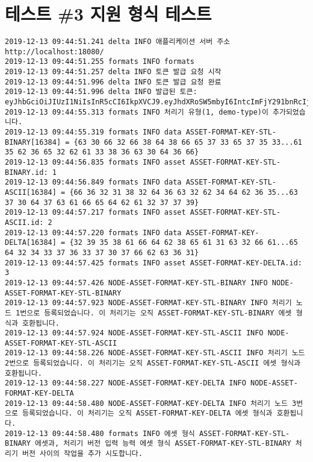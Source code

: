 \section{테스트 \#3 지원 형식 테스트}
\begin{Verbatim}[fontsize=\tiny, breaklines=true, breakanywhere=true]
2019-12-13 09:44:51.241 delta INFO 애플리케이션 서버 주소 http://localhost:18080/
2019-12-13 09:44:51.255 formats INFO formats
2019-12-13 09:44:51.257 delta INFO 토큰 발급 요청 시작
2019-12-13 09:44:51.996 delta INFO 토큰 발급 요청 완료
2019-12-13 09:44:51.996 delta INFO 발급된 토큰: eyJhbGciOiJIUzI1NiIsInR5cCI6IkpXVCJ9.eyJhdXRoSW5mbyI6IntcImFjY291bnRcIjp7XCJpZFwiOjEsXCJ1c2VybmFtZVwiOlwiRGVmYXVsdEFkbWluVXNlclwifSxcInJvbGVcIjpcIkFkbWluXCJ9IiwianRpIjoiZWNiZWE5MmM1MmJiYmI2MzA1ZDE3ZGEzMjU1ZGE4ZjVjNTk3MzY5MmEyZDBmYjk5MTU4MDlkZTg3ZTNlYTQyNyIsImlzcyI6IkRlbHRhLkFwcFNlcnZlciIsImF1ZCI6IkRlbHRhLkFwcFNlcnZlciJ9.KzRVc8eEGg7VPTk5fZzyi3lK_OQnYqWtGm2fnFbc3FI
2019-12-13 09:44:55.313 formats INFO 처리기 유형(1, demo-type)이 추가되었습니다.
2019-12-13 09:44:55.319 formats INFO data ASSET-FORMAT-KEY-STL-BINARY[16384] = {63 30 66 32 66 38 64 38 66 65 37 33 65 37 35 33...61 35 62 36 65 32 62 61 33 38 36 63 30 64 36 66}
2019-12-13 09:44:56.835 formats INFO asset ASSET-FORMAT-KEY-STL-BINARY.id: 1
2019-12-13 09:44:56.849 formats INFO data ASSET-FORMAT-KEY-STL-ASCII[16384] = {66 36 32 31 38 32 64 36 63 32 62 34 64 62 36 35...63 37 30 64 37 63 61 66 65 64 62 61 32 37 37 39}
2019-12-13 09:44:57.217 formats INFO asset ASSET-FORMAT-KEY-STL-ASCII.id: 2
2019-12-13 09:44:57.220 formats INFO data ASSET-FORMAT-KEY-DELTA[16384] = {32 39 35 38 61 66 64 62 38 65 61 31 63 32 66 61...65 64 32 34 33 37 36 33 37 30 37 66 62 63 36 31}
2019-12-13 09:44:57.425 formats INFO asset ASSET-FORMAT-KEY-DELTA.id: 3
2019-12-13 09:44:57.426 NODE-ASSET-FORMAT-KEY-STL-BINARY INFO NODE-ASSET-FORMAT-KEY-STL-BINARY
2019-12-13 09:44:57.923 NODE-ASSET-FORMAT-KEY-STL-BINARY INFO 처리기 노드 1번으로 등록되었습니다. 이 처리기는 오직 ASSET-FORMAT-KEY-STL-BINARY 에셋 형식과 호환됩니다.
2019-12-13 09:44:57.924 NODE-ASSET-FORMAT-KEY-STL-ASCII INFO NODE-ASSET-FORMAT-KEY-STL-ASCII
2019-12-13 09:44:58.226 NODE-ASSET-FORMAT-KEY-STL-ASCII INFO 처리기 노드 2번으로 등록되었습니다. 이 처리기는 오직 ASSET-FORMAT-KEY-STL-ASCII 에셋 형식과 호환됩니다.
2019-12-13 09:44:58.227 NODE-ASSET-FORMAT-KEY-DELTA INFO NODE-ASSET-FORMAT-KEY-DELTA
2019-12-13 09:44:58.480 NODE-ASSET-FORMAT-KEY-DELTA INFO 처리기 노드 3번으로 등록되었습니다. 이 처리기는 오직 ASSET-FORMAT-KEY-DELTA 에셋 형식과 호환됩니다.
2019-12-13 09:44:58.480 formats INFO 에셋 형식 ASSET-FORMAT-KEY-STL-BINARY 에셋과, 처리기 버전 입력 능력 에셋 형식 ASSET-FORMAT-KEY-STL-BINARY 처리기 버전 사이의 작업을 추가 시도합니다.

\end{Verbatim}
